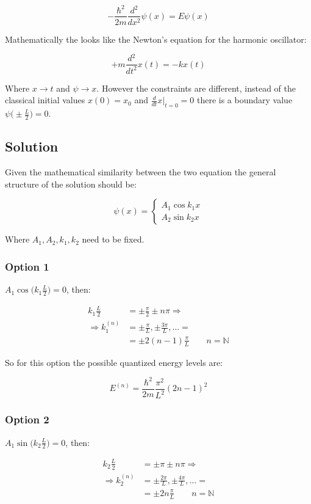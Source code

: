$$-\frac{\hbar^2}{2m}\frac{d{^2}}{d{x^2}}\psi(x) = E\psi(x)$$

Mathematically the looks like the Newton's equation for the harmonic oscillator:

$$+m \frac{d{^2}}{d{t^2}}x(t) = -kx(t)$$

Where $x\rightarrow t$ and $\psi\rightarrow x$.
However the constraints are different, instead of the classical initial values $x(0) = x_0$ and $\frac{d{}}{d{t}}x|_{t=0} = 0$ there is a boundary value $\psi\biggl(\pm \frac{L}{2}\biggr) = 0$.

  \subsection{Solution}
  Given the mathematical similarity between the two equation the general structure of the solution should be:

  $$\psi(x) = \begin{cases}A_1\cos k_1 x \\A_2\sin k_2x\end{cases}$$

  Where $A_1,A_2,k_1, k_2$ need to be fixed.

    \subsubsection{Option 1}
    $A_1\cos\biggl(k_1 \frac{L}{2}\biggr) = 0$, then:

    \begin{align*}
      k_1 \frac{L}{2} &=\pm \frac{\pi}{2}\pm n\pi\Rightarrow\\
      \Rightarrow k_1^{(n)} &=\pm \frac{\pi}{L},\pm \frac{3\pi}{L},\dots =\\
                            &= \pm 2(n-1)\frac{\pi}{L}\qquad n = \mathbb{N}
    \end{align*}

    So for this option the possible quantized energy levels are:

    $$E^{(n)} = \frac{\hbar^2}{2m}\frac{\pi^2}{L^2}(2n-1)^2$$

    \subsubsection{Option 2}
    $A_1\sin\biggl(k_2 \frac{L}{2}\biggr) = 0$, then:

    \begin{align*}
      k_2 \frac{L}{2} &=\pm \pi\pm n\pi\Rightarrow\\
      \Rightarrow k_2^{(n)} &=\pm \frac{2\pi}{L},\pm \frac{4\pi}{L},\dots =\\
                            &= \pm 2n\frac{\pi}{L}\qquad n = \mathbb{N}
    \end{align*}

